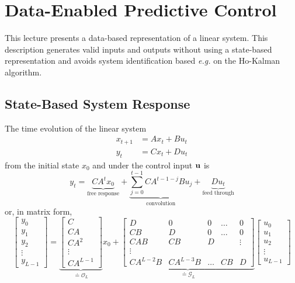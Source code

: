 \chapter{Data-Enabled Predictive Control}
\label{chap:deepc}

This lecture presents a data-based representation of a linear system. This description generates valid inputs and outputs without using a state-based representation and avoids system identification based \textit{e.g.} on the Ho-Kalman algorithm.

\section{State-Based System Response}
\label{sec:deepc-state-based-response}

The time evolution of the linear system
\begin{equation*}
  \begin{aligned}
    x_{t+1} &= Ax_t + Bu_t \\
    y_t &= Cx_t + Du_t
  \end{aligned}
\end{equation*}
from the initial state $x_0$ and under the control input $\boldsymbol{\mathrm{u}}$ is
\begin{equation}
  \label{eq:time-evolution-free-response-convolution}
  y_t = \underbrace{CA^tx_0}_{\text{free response}} + \underbrace{\sum_{j=0}^{t-1}CA^{t-1-j}Bu_j}_{\text{convolution}} + \underbrace{Du_t}_{\text{feed through}}
\end{equation}
or, in matrix form,
\begin{equation}
  \label{eq:time-evolution-free-response-convolution-matrix}
  \begin{bmatrix}
    y_0 \\ y_1 \\ y_2 \\ \vdots \\ y_{L-1}
  \end{bmatrix} = \underbrace{
    \begin{bmatrix}
      C \\ CA \\ CA^2 \\ \vdots \\ CA^{L-1}
    \end{bmatrix}
  }_{\doteq\mathcal{O}_L} x_0 + \underbrace{
  \begin{bmatrix}
    D & 0 & 0 & \ldots & 0 \\
    CB & D & 0 & \ldots & 0 \\
    CAB & CB & D & & \vdots \\
    \vdots \\
    CA^{L-2}B & CA^{L-3}B & \ldots & CB & D
  \end{bmatrix}}_{\doteq\mathcal{G}_L}
\begin{bmatrix}
  u_0 \\ u_1 \\ u_2 \\ \vdots \\ u_{L-1}
  \end{bmatrix}
\end{equation}
